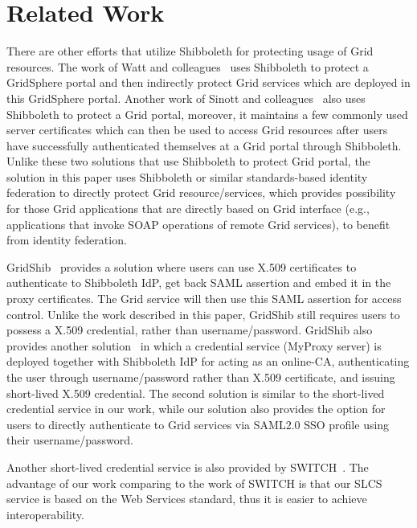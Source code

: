 \documentclass[conference]{IEEEtran}
\begin{document}
\section{Related Work}
\label{sec:relatedwork}

There are other efforts that utilize Shibboleth for protecting usage of Grid
resources. The work of Watt and colleagues~\cite{J.Watt06} uses Shibboleth to protect a GridSphere portal and
then indirectly protect Grid services which are deployed in this GridSphere portal.
Another work of Sinott and colleagues~\cite{R.O.Sinnott06} also uses Shibboleth to protect a Grid portal,
moreover, it maintains a few commonly used server certificates which can then be used to access
Grid resources after users have successfully authenticated themselves at a Grid portal
through Shibboleth. Unlike these two solutions that use Shibboleth to protect Grid
portal, the solution in this paper uses Shibboleth or similar standards-based identity federation to
directly protect Grid resource/services, which provides possibility for those Grid applications
that are directly based on Grid interface (e.g., applications that invoke SOAP operations of
remote Grid services), to benefit from identity federation.

GridShib~\cite{T.Scavo07,VWelch05} provides a solution where users can use
X.509 certificates to authenticate to Shibboleth IdP, get back SAML assertion and embed
it in the proxy certificates. The Grid service will then use this SAML assertion for
access control. Unlike the work described in this paper, GridShib still requires users to
possess a X.509 credential, rather than username/password. GridShib also provides another 
solution~\cite{TBarton06} in which a credential service (MyProxy server) is
deployed together with Shibboleth IdP for acting as an online-CA, authenticating the user through
username/password rather than X.509 certificate, and issuing short-lived X.509 credential. The
second solution is similar to the short-lived credential service in our work, while our
solution also provides the option for users to directly authenticate to Grid services via
SAML2.0 SSO profile using their username/password.

Another short-lived credential service is also provided by SWITCH~\cite{switchslcslink}. 
The advantage of our work comparing to the work of SWITCH is that 
our SLCS service is based on the Web Services standard, thus it is easier to
achieve interoperability.
\end{document}
